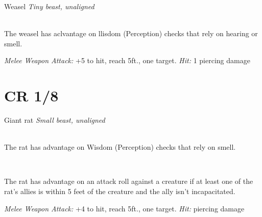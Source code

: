 \documentclass[10pt,twoside,twocolumn,openany]{book}
\begin{document}
\begin{monsterboxnobg}{Weasel}
	\textit{Tiny beast, unaligned}\\
	\hline
	\basics[
		armorclass	= 13,
		hitpoints 		= \dice{1d4 - 1},
		speed		= {30 ft.}
	]
	\hline
	\stats[
		STR	= \stat{3},
		DEX	= \stat{16},
		CON	= \stat{8},
		INT	= \stat{2},
		WIS	= \stat{12},
		CHA	= \stat{3}
	]
	\hline
	\details[
		skills			= {Perception +3, Stealth +5},
		senses 		= {passive Perception 13},
		languages		= {-},
		challenge		= 0
	]
	\hline \\[1mm]
	\begin{monsteraction}
		The weasel has aclvantage on llisdom (Perception) checks that rely on hearing or smell.
	\end{monsteraction}
	\begin{monsteraction}[Bite]
		\textit{Melee Weapon Attack:} +5 to hit, reach 5ft., one target. \textit{Hit:} 1 piercing damage
	\end{monsteraction}
\end{monsterboxnobg}
\clearpage
\section{CR 1/8}

\begin{monsterboxnobg}{Giant rat}
	\textit{Small beast, unaligned}\\
	\hline
	\basics[
		armorclass	= 12,
		hitpoints 		= \dice{2d6},
		speed		= {30 ft.}
	]
	\hline
	\stats[
		STR	= \stat{7},
		DEX	= \stat{15},
		CON	= \stat{11},
		INT	= \stat{2},
		WIS	= \stat{10},
		CHA	= \stat{4}
	]
	\hline
	\details[
		skills			= {},
		senses 		= {darkvision 60 ft. passive Perception 10},
		languages		= {-},
		challenge		= 1/8
	]
	\hline \\[1mm]
	\begin{monsteraction}
		The rat has advantage on Wisdom (Perception) checks that rely on smell.
	\end{monsteraction}\\
	\begin{monsteraction}[PackTactics]
		The rat has advantage on an attack roll against a creature if at least one of the rat's allies is within 5 feet of the creature and the ally isn't incapacitated.
	\end{monsteraction}
	\begin{monsteraction}[Bite]
		\textit{Melee Weapon Attack:} +4 to hit, reach 5ft., one target. \textit{Hit:}  piercing damage
	\end{monsteraction}
\end{monsterboxnobg}
\end{document}
